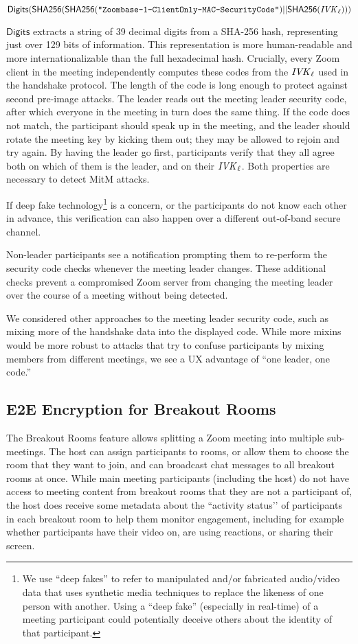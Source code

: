 $$\mathsf{Digits}({\sf SHA256}({\sf SHA256}(\texttt{"Zoombase-1-ClientOnly-MAC-SecurityCode"}) || {\sf SHA256}(\mathit{IVK}_{\ell})))$$

$\mathsf{Digits}$ extracts a string of 39 decimal digits from a SHA-256 hash, representing just over 129 bits of information. This representation is more human-readable and more internationalizable than the full hexadecimal hash. Crucially, every Zoom client in the meeting independently computes these codes from the $\mathit{IVK}_{\ell}$ used in the handshake protocol. The length of the code is long enough to protect against second pre-image attacks. The leader reads out the meeting leader security code, after which everyone in the meeting in turn does the same thing. If the code does not match, the participant should speak up in the meeting, and the leader should rotate the meeting key by kicking them out; they may be allowed to rejoin and try again. By having the leader go first, participants verify that they all agree both on which of them is the leader, and on their $\mathit{IVK}_{\ell}$. Both properties are necessary to detect MitM attacks.

If deep fake technology\footnote{We use ``deep fakes'' to refer to manipulated and/or fabricated audio/video data that uses synthetic media techniques to replace the likeness of one person with another. Using a ``deep fake'' (especially in real-time) of a meeting participant could potentially deceive others about the identity of that participant.} is a concern, or the participants do not know each other in advance, this verification can also happen over a different out-of-band secure channel.

Non-leader participants see a notification prompting them to re-perform the security code checks
whenever the meeting leader changes. These additional checks prevent a compromised Zoom server from
changing the meeting leader over the course of a meeting without being detected.

We considered other approaches to the meeting leader security code, such as mixing more of the handshake data into the displayed code. While more mixins would be more robust to attacks that try to confuse participants by mixing members from different meetings, we see a UX advantage of ``one leader, one code.''

\subsection{E2E Encryption for Breakout Rooms}
\label{subsec:bor}
The Breakout Rooms feature allows splitting a Zoom meeting into multiple sub-meetings. The host can
assign participants to rooms, or allow them to choose the room that they want to join, and can
broadcast chat messages to all breakout rooms at once. While main meeting participants (including
the host) do not have access to meeting content from breakout rooms that they are not a participant
of, the host does receive some metadata about the ``activity status’’ of participants in each
breakout room to help them monitor engagement, including for example whether participants have their
video on, are using reactions, or sharing their screen.

